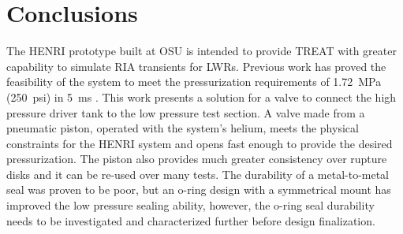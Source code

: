 \section{Conclusions} \label{s:conclusion}
The HENRI prototype built at OSU is intended to provide TREAT with greater capability to simulate RIA transients for LWRs.
Previous work has proved the feasibility of the system to meet the pressurization requirements of \SI{1.72}{\mega\pascal} (\SI{250}{psi}) in \SI{5}{\milli\second} \cite{HeNURETH}.
This work presents a solution for a valve to connect the high pressure driver tank to the low pressure test section.
A valve made from a pneumatic piston, operated with the system's helium, meets the physical constraints for the HENRI system and opens fast enough to provide the desired pressurization.
The piston also provides much greater consistency over rupture disks and it can be re-used over many tests.
The durability of a metal-to-metal seal was proven to be poor, but an o-ring design with a symmetrical mount has improved the low pressure sealing ability, however, the o-ring seal durability needs to be investigated and characterized further before design finalization.